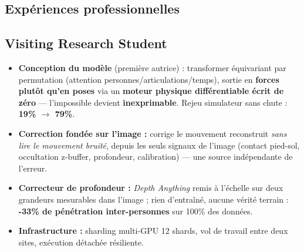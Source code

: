\documentclass{assets/template/cvclass}
\def\spaceSections{0.13cm}
\begin{document}
\begin{area-right}
  \section{Expériences professionnelles}
  \vspace{\spaceSections}


    \subsection{Visiting Research Student}
      \begin{itemize}
        \item \textbf{Conception du modèle} (première autrice) : transformer équivariant par permutation (attention personnes/articulations/temps), sortie en \textbf{forces plutôt qu'en poses} via un \textbf{moteur physique différentiable écrit de zéro} --- l'impossible devient \textbf{inexprimable}. Rejeu simulateur sans chute : \textbf{19\% $\to$ 79\%}.
        \item \textbf{Correction fondée sur l'image :} corrige le mouvement reconstruit \textit{sans lire le mouvement bruité}, depuis les seuls signaux de l'image (contact pied-sol, occultation z-buffer, profondeur, calibration) --- une source indépendante de l'erreur.
        \item \textbf{Correcteur de profondeur :} \textit{Depth Anything} remis à l'échelle sur deux grandeurs mesurables dans l'image ; rien d'entraîné, aucune vérité terrain : \textbf{-33\% de pénétration inter-personnes} sur 100\% des données.
        \item \textbf{Infrastructure :} sharding multi-GPU 12 shards, vol de travail entre deux sites, exécution détachée résiliente.
      \end{itemize}
      \vspace{\spaceSections}
      


\end{area-right}
\end{document}
